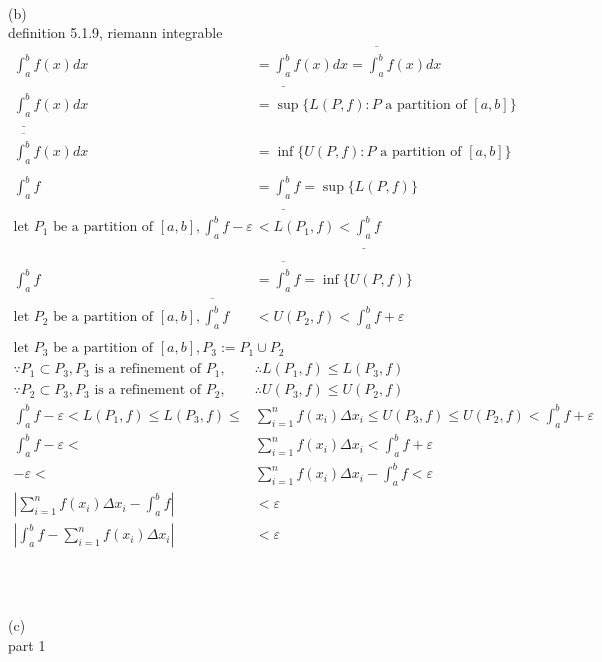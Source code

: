 \documentclass[12pt, border = 4pt, multi]{article} %
\begin{document}
\\
\\
\\
(b)\\
definition 5.1.9, riemann integrable
\begin{align*}
\int_a ^ b f(x) dx &=  \underline{\int_a ^ b}f(x)dx = \overline{\int_a ^ b}f(x)dx\\
\underline{\int_a ^ b}f(x)dx &= \sup\{L(P, f): P \text{ a partition of }[a, b]\}\\
\overline{\int_a ^ b}f(x)dx &= \inf\{U(P, f): P \text{ a partition of }[a, b]\}\\
\\
\int_a ^ b f &= \underline{\int_a ^ b} f = \sup\{L(P, f)\}\\
\text{let } P_1 \text{ be a partition of }[a, b], \int_a ^ b f - \varepsilon &< L(P_1, f) < \underline{\int_a ^ b} f\\
\\
\int_a ^ b f &= \overline{\int_a ^ b} f = \inf\{U(P, f)\}\\
\text{let } P_2 \text{ be a partition of }[a, b], \overline{\int_a ^ b} f &< U(P_2, f) < \int_a ^ b f + \varepsilon\\
\\
\text{let } P_3 \text{ be a partition of }[a, b], P_3 := P_1 \cup P_2\\
\because P_1 \subset P_3, P_3 \text{ is a refinement of } P_1, &\therefore L(P_1, f) \leq L(P_3, f)\\
\because P_2 \subset P_3, P_3 \text{ is a refinement of } P_2, &\therefore U(P_3, f) \leq U(P_2, f)\\
\int_a ^ b f - \varepsilon < L(P_1, f) \leq L(P_3, f) \leq &\sum_{i = 1} ^ n f(x_i)\Delta x_i \leq U(P_3, f) \leq U(P_2, f) < \int_a ^ b f + \varepsilon\\
\int_a ^ b f - \varepsilon < &\sum_{i = 1} ^ n f(x_i)\Delta x_i < \int_a ^ b f + \varepsilon\\
- \varepsilon < &\sum_{i = 1} ^ n f(x_i)\Delta x_i - \int_a ^ b f < \varepsilon\\
\left|\sum_{i = 1} ^ n f(x_i)\Delta x_i - \int_a ^ b f\right| &< \varepsilon\\
\left|\int_a ^ b f - \sum_{i = 1} ^ n f(x_i)\Delta x_i\right| &< \varepsilon\\
\end{align*}
\\
\\
\\
(c)\\
part 1
\end{document}
